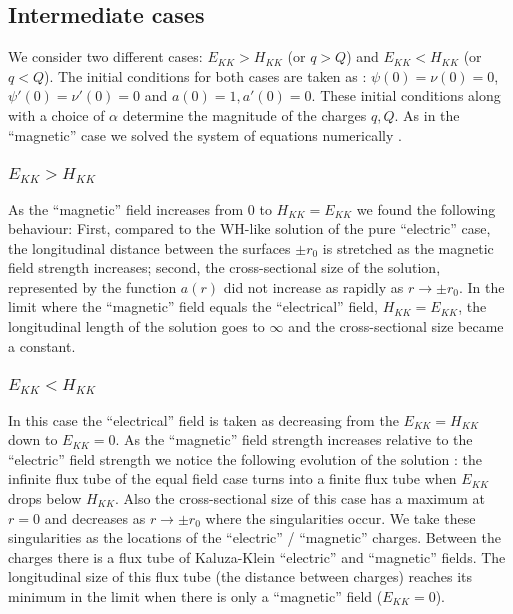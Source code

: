 \subsection{Intermediate cases} 

We consider two different cases: 
$E_{KK} > H_{KK}$ (or $q > Q$) and $E_{KK} < H_{KK}$
(or $q<Q$). The initial conditions  for both cases are 
taken as : $\psi (0) = \nu (0) = 0$, 
$\psi '(0) = \nu '(0) = 0$ and $a(0) = 1, a'(0) = 0$. These
initial conditions along with a choice of $\alpha$ determine
the magnitude of the charges $q , Q$. As in the ``magnetic'' case we solved
the system of equations numerically \cite{dzhds}.

\subsubsection{$E_{KK} > H_{KK}$}

As the ``magnetic'' field increases from $0$ 
to $H_{KK}=E_{KK}$ we found the following behaviour:
First, compared to the WH-like solution
of the pure ``electric'' case, the longitudinal distance 
between the surfaces $\pm r_0$ is stretched as the magnetic field
strength increases; second, the cross-sectional
size of the solution, represented by the function $a(r)$ did not
increase as rapidly as $r \rightarrow \pm r_0$. In the limit
where the ``magnetic'' field equals the ``electrical'' field, 
$H_{KK}=E_{KK}$, the longitudinal length of the solution
goes to $\infty$ and the cross-sectional  size became a
constant.

\subsubsection{$E_{KK} < H_{KK}$}

In this case the ``electrical'' field is taken
as decreasing from the $E_{KK}=H_{KK}$ down to
$E_{KK}=0$. As the ``magnetic'' field strength increases
relative to the ``electric'' field strength we notice
the following evolution of the solution : the infinite
flux tube of the equal field case turns into a finite flux
tube when $E_{KK}$ drops below $H_{KK}$. Also the cross-sectional
size of this case has a maximum at $r=0$ and decreases as
$r \rightarrow \pm r_0$ where the singularities occur. We take these
singularities as the locations of the ``electric'' / ``magnetic''
charges. Between the charges there is a flux tube of
Kaluza-Klein ``electric'' and ``magnetic'' fields. The longitudinal 
size of this flux tube (the distance between charges) reaches its
minimum in the limit when there is only a ``magnetic'' field
($E_{KK} = 0$).

